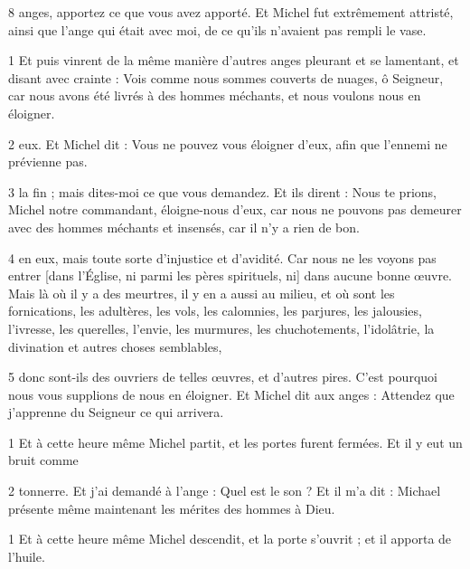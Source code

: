 \par 8 anges, apportez ce que vous avez apporté. Et Michel fut extrêmement attristé, ainsi que l'ange qui était avec moi, de ce qu'ils n'avaient pas rempli le vase.


\par 1 Et puis vinrent de la même manière d'autres anges pleurant et se lamentant, et disant avec crainte : Vois comme nous sommes couverts de nuages, ô Seigneur, car nous avons été livrés à des hommes méchants, et nous voulons nous en éloigner.

\par 2 eux. Et Michel dit : Vous ne pouvez vous éloigner d'eux, afin que l'ennemi ne prévienne pas.

\par 3 la fin ; mais dites-moi ce que vous demandez. Et ils dirent : Nous te prions, Michel notre commandant, éloigne-nous d'eux, car nous ne pouvons pas demeurer avec des hommes méchants et insensés, car il n'y a rien de bon.

\par 4 en eux, mais toute sorte d'injustice et d'avidité. Car nous ne les voyons pas entrer [dans l’Église, ni parmi les pères spirituels, ni] dans aucune bonne œuvre. Mais là où il y a des meurtres, il y en a aussi au milieu, et où sont les fornications, les adultères, les vols, les calomnies, les parjures, les jalousies, l'ivresse, les querelles, l'envie, les murmures, les chuchotements, l'idolâtrie, la divination et autres choses semblables,

\par 5 donc sont-ils des ouvriers de telles œuvres, et d'autres pires. C'est pourquoi nous vous supplions de nous en éloigner. Et Michel dit aux anges : Attendez que j'apprenne du Seigneur ce qui arrivera.


\par 1 Et à cette heure même Michel partit, et les portes furent fermées. Et il y eut un bruit comme

\par 2 tonnerre. Et j'ai demandé à l'ange : Quel est le son ? Et il m'a dit : Michael présente même maintenant les mérites des hommes à Dieu.


\par 1 Et à cette heure même Michel descendit, et la porte s'ouvrit ; et il apporta de l'huile.

